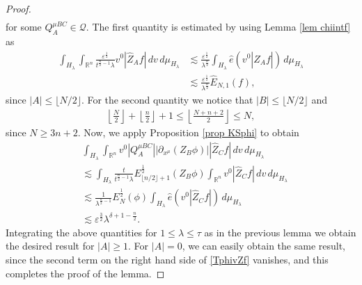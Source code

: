 \documentclass{article}
\newcommand{\bbr}{{\mathbb R}}
\newcommand{\bbrn}{{\bbr^n}}
\newcommand{\cQ}{{\mathcal Q}}
\begin{document}
\begin{proof}
\begin{align*}
\end{align*}
for some $ Q^{ \mu B C }_{ A } \in \cQ $. The first quantity is estimated by using Lemma \ref{lem chiintf} as
\begin{align*}
\int_{ H_\lambda } \int_\bbrn \frac{ \varepsilon^{ \frac12 } }{ t^{ \frac{ n }{ 2 } - 1 } \lambda } v^0 | \hat{ Z }_A f | \, d v \, d \mu_{ H_\lambda } & \lesssim \frac{ \varepsilon^{ \frac12 } }{ \lambda^{ \frac{ n }{ 2 } } } \int_{ H_\lambda } \hat{ e } ( v^0 | \hat{ Z }_A f | ) \, d \mu_{ H_\lambda } \\
& \lesssim \frac{ \varepsilon^{ \frac12 } }{ \lambda^{ \frac{ n }{ 2 } } } \hat{ E }_{ N , 1 } ( f ) ,
\end{align*}
since $ | A | \leq \lfloor N / 2 \rfloor $. For the second quantity we notice that $ | B | \leq \lfloor N / 2 \rfloor $ and
\begin{align*}
\left\lfloor \frac{ N }{ 2 } \right\rfloor + \left\lfloor \frac{ n }{ 2 } \right\rfloor + 1 \leq \left\lfloor \frac{ N + n + 2 }{ 2 } \right\rfloor \leq N ,
\end{align*}
since $ N \geq 3 n + 2 $. Now, we apply Proposition \ref{prop KSphi} to obtain
\begin{align*}
& \int_{ H_\lambda } \int_\bbrn v^0 | Q^{ \mu B C }_{ A } | | \partial_{ x^\mu } ( Z_B \phi ) | | \hat{ Z }_C f | \, d v \, d \mu_{ H_\lambda } \\
& \lesssim \int_{ H_\lambda } \frac{ t }{ t^{ \frac{ n }{ 2 } - 1 } \lambda } E_{ \lfloor n / 2 \rfloor + 1 }^{ \frac12 } ( Z_B \phi ) \int_\bbrn v^0 | \hat{ Z }_C f | \, d v \, d \mu_{ H_\lambda } \\
& \lesssim \frac{ 1 }{ \lambda^{ \frac{ n }{ 2 } - 1 } } E_N^{ \frac12 } ( \phi ) \int_{ H_\lambda } \hat{ e } ( v^0 | \hat{ Z }_C f | ) \, d \mu_{ H_\lambda } \\
& \lesssim \varepsilon^{ \frac{ 3 }{ 2 } } \lambda^{ \delta + 1 - \frac{ n }{ 2 } } .
\end{align*}
Integrating the above quantities for $ 1 \leq \lambda \leq \tau $ as in the previous lemma we obtain the desired result for $ | A | \geq 1 $. For $ | A | = 0 $, we can easily obtain the same result, since the second term on the right hand side of \eqref{TphivZf} vanishes, and this completes the proof of the lemma.
\end{proof}
\end{document}
